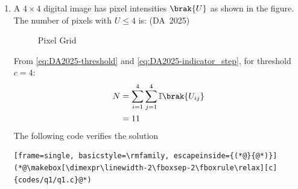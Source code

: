 \begin{enumerate}[label=\thesubsection.\arabic*, ref=\thesubsection.\theenumi]
	
	\item 
	A $4 \times 4$ digital image has pixel intensities $\brak{U}$ as shown in the figure. The number of pixels with $U \le 4$ is:
	\hfill (DA~2025)
	\begin{figure}[H]
		\centering
		
		\caption{Pixel Grid}
		\label{fig:DA-2025-3}
	\end{figure}
	\begin{enumerate}
	\end{enumerate}
	\solution
	From \eqref{eq:DA2025-threshold} and \eqref{eq:DA2025-indicator_step}, for threshold $c = 4$:
	\begin{align}
		N &= \sum_{i=1}^4 \sum_{j=1}^4 \mathbb{I}\brak{U_{ij}}
		\\
		&= 11
	\end{align}
		The following code verifies the solution
	\begin{lstlisting}[frame=single, basicstyle=\rmfamily, escapeinside={(*@}{@*)}]
(*@\makebox[\dimexpr\linewidth-2\fboxsep-2\fboxrule\relax][c]{codes/q1/q1.c}@*)
	\end{lstlisting}
	

\end{enumerate}
